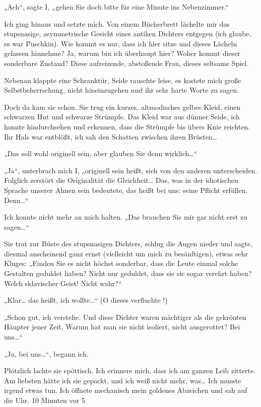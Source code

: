 „Ach“, sagte I, „gehen Sie doch bitte für eine Minute
ins Nebenzimmer.“

Ich ging hinaus und setzte mich. Von einem Bücherbrett lächelte mir
das stupsnasige, asymmetrische Gesicht eines antiken Dichters
entgegen (ich glaube, es war Puschkin). Wie kommt es nur, dass ich
hier sitze und dieses Lächeln gelassen hinnehme? Ja, warum bin ich
überhaupt hier? Woher kommt dieser sonderbare Zustand?
Diese
aufreizende, abstoßende Frau, dieses seltsame Spiel.

Nebenan klappte eine Schranktür, Seide rauschte leise, es kostete
mich große Selbstbeherrschung, nicht hineinzugehen und ihr sehr
harte Worte zu sagen.

Doch da kam sie schon. Sie trug ein kurzes,
altmodisches gelbes Kleid, einen schwarzen Hut und schwarze
Strümpfe. Das Kleid war aus dünner Seide, ich konnte hindurchsehen
und erkennen, dass die Strümpfe bis übers Knie reichten. Ihr Hals
war entblößt, ich sah den Schatten zwischen ihren Brüsten\ldots{}

„Das soll wohl originell sein, aber glauben Sie denn wirklich\ldots{}“

„Ja“, unterbrach mich I, „originell sein heißt, sich von den
anderen unterscheiden. Folglich zerstört die Originalität die
Gleichheit\ldots{} Das, was in der idiotischen Sprache unserer Ahnen
 sein bedeutete, das heißt bei uns: seine Pflicht erfüllen.
Denn\ldots{}“

Ich konnte nicht mehr an mich halten. „Das brauchen Sie mir gar
nicht erst zu sagen\ldots{}“

Sie trat zur Büste des stupsnasigen Dichters, schlug die Augen
nieder und sagte, diesmal anscheinend ganz ernst (vielleicht um
mich zu besänftigen), etwas sehr Kluges: „Finden Sie es nicht
höchst sonderbar, dass die Leute einmal solche Gestalten geduldet
haben? Nicht nur geduldet, dass sie sie sogar verehrt haben? Welch
sklavischer Geist! Nicht wahr?“

„Klar\ldots{} das heißt, ich wollte\ldots{}“ (O dieses verfluchte !)

„Schon gut, ich verstehe. Und diese Dichter waren mächtiger als die
gekrönten Häupter jener Zeit, Warum hat man sie nicht isoliert,
nicht ausgerottet? Bei uns\ldots{}“

„Ja, bei uns\ldots{}“, begann ich.

Plötzlich lachte sie spöttisch. Ich erinnere mich, dass ich am
ganzen Leib zitterte. Am liebsten hätte ich sie gepackt, und ich
weiß nicht mehr, was\ldots{} Ich musste irgend etwas tun. Ich öffnete
mechanisch mein goldenes Abzeichen und sah auf die Uhr. 10 Minuten
vor 5.

